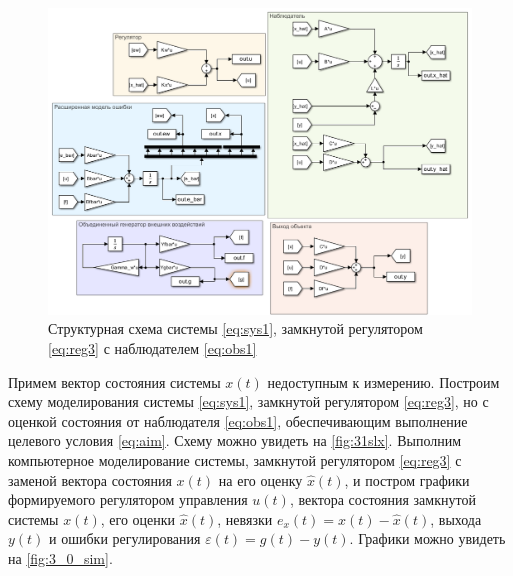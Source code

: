 \begin{figure}[H]
    \centering
    \includegraphics[width=\linewidth]{figs/3_1_slx.png}
    \caption{Структурная схема системы \eqref{eq:sys1}, замкнутой регулятором
    \eqref{eq:reg3} с наблюдателем \eqref{eq:obs1}}
    \label{fig:31slx}
\end{figure}

Примем вектор состояния системы $x(t)$ недоступным к измерению.
Построим схему моделирования системы \eqref{eq:sys1}, замкнутой регулятором
\eqref{eq:reg3}, но с оценкой состояния от наблюдателя \eqref{eq:obs1},
обеспечивающим выполнение целевого условия \eqref{eq:aim}. Схему можно увидеть на 
\autoref{fig:31slx}.
Выполним компьютерное моделирование системы, замкнутой регулятором
\eqref{eq:reg3} с заменой вектора состояния $x(t)$ на его оценку $\hat x(t)$, 
и постром графики
формируемого регулятором управления $u(t)$, вектора состояния замкнутой
системы $x(t)$, его оценки $\hat x(t)$, невязки $e_x(t) = x(t)-\hat x(t)$, 
выхода $y(t)$ и ошибки регулирования $\varepsilon(t) = g(t) - y(t)$.
Графики можно увидеть на \autoref{fig:3_0_sim}.

